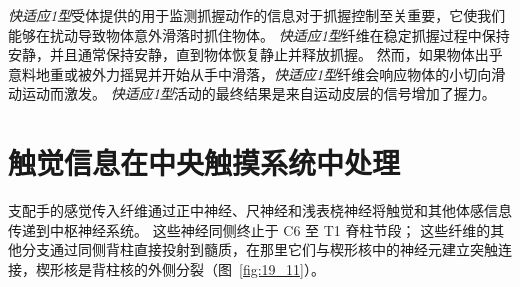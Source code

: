 \textit{快适应1型}受体提供的用于监测抓握动作的信息对于抓握控制至关重要，它使我们能够在扰动导致物体意外滑落时抓住物体。
\textit{快适应1型}纤维在稳定抓握过程中保持安静，并且通常保持安静，直到物体恢复静止并释放抓握。
然而，如果物体出乎意料地重或被外力摇晃并开始从手中滑落，\textit{快适应1型}纤维会响应物体的小切向滑动运动而激发。 
\textit{快适应1型}活动的最终结果是来自运动皮层的信号增加了握力。



\section{触觉信息在中央触摸系统中处理}

支配手的感觉传入纤维通过正中神经、尺神经和浅表桡神经将触觉和其他体感信息传递到中枢神经系统。
这些神经同侧终止于 C6 至 T1 脊柱节段；
这些纤维的其他分支通过同侧背柱直接投射到髓质，在那里它们与楔形核中的神经元建立突触连接，楔形核是背柱核的外侧分裂（图~\ref{fig:19_11}）。


